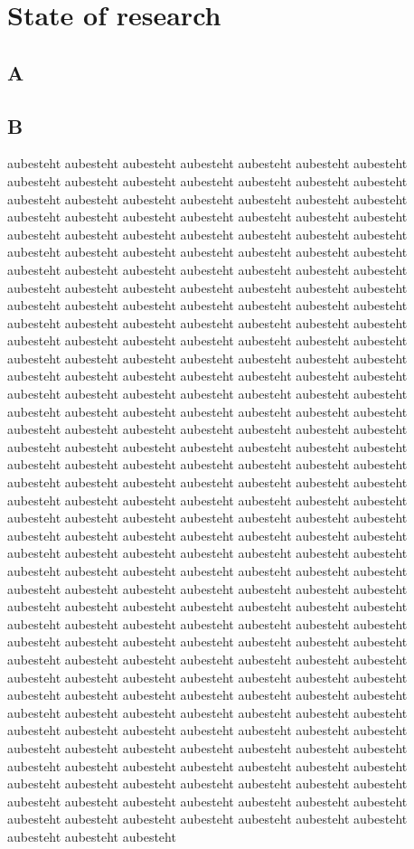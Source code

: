  
\section{State of research}
\subsection{A}
 

\subsection{B}
aubesteht aubesteht aubesteht aubesteht aubesteht aubesteht aubesteht aubesteht aubesteht aubesteht aubesteht aubesteht aubesteht aubesteht aubesteht aubesteht aubesteht aubesteht aubesteht aubesteht aubesteht aubesteht aubesteht aubesteht aubesteht aubesteht aubesteht aubesteht aubesteht aubesteht aubesteht aubesteht aubesteht aubesteht aubesteht aubesteht aubesteht aubesteht aubesteht aubesteht aubesteht aubesteht aubesteht aubesteht aubesteht aubesteht aubesteht aubesteht aubesteht aubesteht aubesteht aubesteht aubesteht aubesteht aubesteht aubesteht aubesteht aubesteht aubesteht aubesteht aubesteht aubesteht aubesteht aubesteht aubesteht aubesteht aubesteht aubesteht aubesteht aubesteht aubesteht aubesteht aubesteht aubesteht aubesteht aubesteht aubesteht aubesteht aubesteht aubesteht aubesteht aubesteht aubesteht aubesteht aubesteht aubesteht aubesteht aubesteht aubesteht aubesteht aubesteht aubesteht aubesteht aubesteht aubesteht aubesteht aubesteht aubesteht aubesteht aubesteht aubesteht aubesteht aubesteht aubesteht aubesteht aubesteht aubesteht aubesteht aubesteht aubesteht aubesteht aubesteht aubesteht aubesteht aubesteht aubesteht aubesteht aubesteht aubesteht aubesteht aubesteht aubesteht aubesteht aubesteht aubesteht aubesteht aubesteht aubesteht aubesteht aubesteht aubesteht aubesteht aubesteht aubesteht aubesteht aubesteht aubesteht aubesteht aubesteht aubesteht aubesteht aubesteht aubesteht aubesteht aubesteht aubesteht aubesteht aubesteht aubesteht aubesteht aubesteht aubesteht aubesteht aubesteht aubesteht aubesteht aubesteht aubesteht aubesteht aubesteht aubesteht aubesteht aubesteht aubesteht aubesteht aubesteht aubesteht aubesteht aubesteht aubesteht aubesteht aubesteht aubesteht aubesteht aubesteht aubesteht aubesteht aubesteht aubesteht aubesteht aubesteht aubesteht aubesteht aubesteht aubesteht aubesteht aubesteht aubesteht aubesteht aubesteht aubesteht aubesteht aubesteht aubesteht aubesteht aubesteht aubesteht aubesteht aubesteht aubesteht aubesteht aubesteht aubesteht aubesteht aubesteht aubesteht aubesteht aubesteht aubesteht aubesteht aubesteht aubesteht aubesteht aubesteht aubesteht aubesteht aubesteht aubesteht aubesteht aubesteht aubesteht aubesteht aubesteht aubesteht aubesteht aubesteht aubesteht aubesteht aubesteht aubesteht aubesteht aubesteht aubesteht aubesteht aubesteht aubesteht aubesteht aubesteht aubesteht aubesteht aubesteht aubesteht aubesteht aubesteht aubesteht aubesteht aubesteht aubesteht aubesteht aubesteht aubesteht aubesteht aubesteht aubesteht aubesteht aubesteht aubesteht aubesteht aubesteht aubesteht aubesteht aubesteht aubesteht aubesteht aubesteht aubesteht aubesteht aubesteht aubesteht 